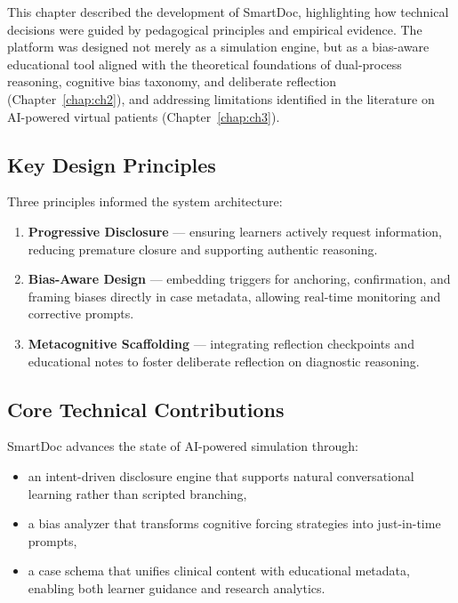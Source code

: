 This chapter described the development of SmartDoc, highlighting how technical
decisions were guided by pedagogical principles and empirical evidence. The
platform was designed not merely as a simulation engine, but as a bias-aware
educational tool aligned with the theoretical foundations of dual-process
reasoning, cognitive bias taxonomy, and deliberate reflection (Chapter~\ref{chap:ch2}),
and addressing limitations identified in the literature on AI-powered virtual
patients (Chapter~\ref{chap:ch3}).

\subsection{Key Design Principles}

Three principles informed the system architecture:

\begin{enumerate}
    \item \textbf{Progressive Disclosure} --- ensuring learners actively
    request information, reducing premature closure and supporting authentic
    reasoning.
    \item \textbf{Bias-Aware Design} --- embedding triggers for anchoring,
    confirmation, and framing biases directly in case metadata, allowing
    real-time monitoring and corrective prompts.
    \item \textbf{Metacognitive Scaffolding} --- integrating reflection
    checkpoints and educational notes to foster deliberate reflection on
    diagnostic reasoning.
\end{enumerate}

\subsection{Core Technical Contributions}

SmartDoc advances the state of AI-powered simulation through:

\begin{itemize}
    \item an intent-driven disclosure engine that supports natural
    conversational learning rather than scripted branching,
    \item a bias analyzer that transforms cognitive forcing strategies into
    just-in-time prompts,
    \item a case schema that unifies clinical content with educational metadata,
    enabling both learner guidance and research analytics.
\end{itemize}

